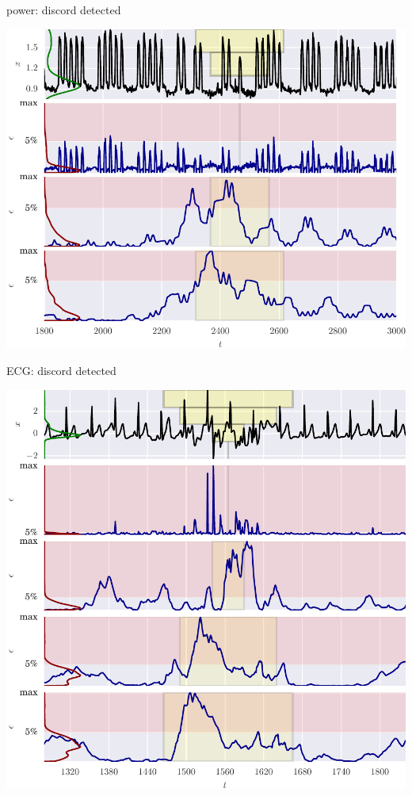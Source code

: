\documentclass{beamer}
\begin{document}
    \begin{frame}{power: discord detected}

      \includegraphics[width=\textwidth]{figs/er_power.pdf}

    \end{frame}


    \begin{frame}{ECG: discord detected}

      \includegraphics[width=\textwidth]{figs/er_ecg.pdf}

    \end{frame}
\end{document}
